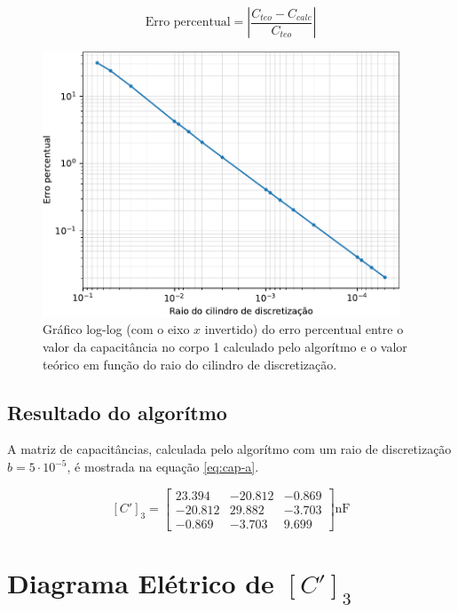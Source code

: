 \documentclass{aleph-revista}
\begin{document}
\begin{equation}\label{eq:erro}
  \text{Erro percentual} = \left|\frac{C_{teo} - C_{calc}}{C_{teo}}\right|
\end{equation}

\begin{figure}[!h]
  \centering
  \includegraphics[width=0.95\textwidth]{figures/calibration}
  \caption{Gráfico log-log (com o eixo $x$ invertido) do erro percentual entre o valor da capacitância no corpo 1 calculado pelo algorítmo e o valor teórico em função do raio do cilindro de discretização.}
  \label{fig:calibration}
\end{figure}




\subsection{Resultado do algorítmo}

A matriz de capacitâncias, calculada pelo algorítmo com um raio de discretização ${b=5\cdot 10^{-5}}$, é mostrada na equação \eqref{eq:cap-a}.

\begin{equation}\label{eq:cap-a}
  [C']_3 =
  \begin{bmatrix}
    23.394  & -20.812 & -0.869 \\
    -20.812 & 29.882  & -3.703 \\
    -0.869  & -3.703  & 9.699
  \end{bmatrix}
  \text{nF}
\end{equation}

\section{Diagrama Elétrico de $[C']_3$}
\end{document}

